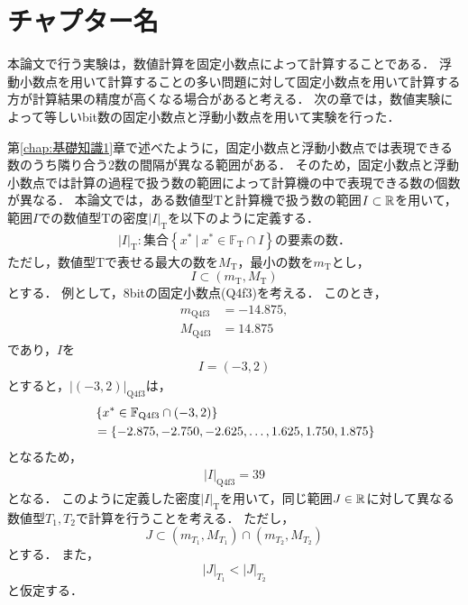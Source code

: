 \chapter {チャプター名}
\label{chap:提案手法}
本論文で行う実験は，数値計算を固定小数点によって計算することである．
浮動小数点を用いて計算することの多い問題に対して固定小数点を用いて計算する方が計算結果の精度が高くなる場合があると考える．
次の章では，数値実験によって等しいbit数の固定小数点と浮動小数点を用いて実験を行った．


第\ref{chap:基礎知識1}章で述べたように，固定小数点と浮動小数点では表現できる数のうち隣り合う2数の間隔が異なる範囲がある．
そのため，固定小数点と浮動小数点では計算の過程で扱う数の範囲によって計算機の中で表現できる数の個数が異なる． %
本論文では，ある数値型$\mathrm{T}$と計算機で扱う数の範囲$I \subset \mathbb{R}$を用いて，範囲$I$での数値型$\mathrm{T}$の密度${|I|}_{\mathrm{T}}$を以下のように定義する．
\begin{align}
    \label{eq:def_density}
    {|I|}_{\mathrm{T}}: \text{集合}\left\{x^{\ast} \ | \ x^{\ast} \in \mathbb{F}_{\mathrm{T}} \cap I \right\}\text{の要素の数．}
\end{align}
ただし，数値型$\mathrm{T}$で表せる最大の数を$M_{\mathrm{T}}$，最小の数を$m_{\mathrm{T}}$とし，
\begin{equation}
    I \subset (m_{\mathrm{T}}, M_{\mathrm{T}})
\end{equation}
とする．
例として，8bitの固定小数点(Q4f3)を考える．
このとき，
\begin{align}
    m_{\mathrm{Q}4\mathrm{f}3} &= -14.875, \\
    M_{\mathrm{Q}4\mathrm{f}3} &= 14.875
\end{align}
であり，$I$を
\begin{eqnarray}
    I = \left(-3,2\right)
\end{eqnarray}
とすると，${|\left(-3,2\right)|}_{\mathrm{Q}4\mathrm{f}3}$は，
\begin{align}
    &\left\{x^{\ast}\in \mathbb{F}_{\text{Q}{4}\text{f}{3}} \cap (-3,2)\right\} \\
    &= \left\{-2.875,-2.750,-2.625,\dots,1.625,1.750,1.875\right\}
\end{align}
となるため，
\begin{align}
    {|I|}_{\mathrm{Q}4\mathrm{f}3} = 39
\end{align}
となる．
このように定義した密度${|I|}_{\mathrm{T}}$を用いて，同じ範囲$J \in \mathbb{R}$に対して異なる数値型$T_1,T_2$で計算を行うことを考える．
ただし，
\begin{equation}
    J \subset (m_{T_1}, M_{T_1}) \cap (m_{T_2}, M_{T_2})
\end{equation}
とする．
また，
\begin{equation}
    {|J|}_{T_1} < {|J|}_{T_2}
\end{equation}
と仮定する．

\begin{figure}[H]
    \centering
\end{figure}

